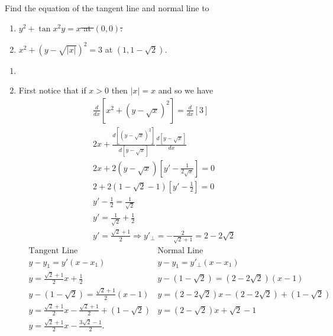 \documentclass[10pt,letterpaper]{hwset}
\begin{document}
\begin{problem}[1.]
	Find the equation of the tangent line and normal line to  
	\begin{enumerate}
		\item \sout{$y^2 + \tan x^2y = x$ at $(0,0)$.}
		\item $x^2+\left(y-\sqrt{|x|}\right)^2=3$ at $(1,1-\sqrt{2})$. 
	\end{enumerate}
\end{problem}

\begin{enumerate}
	\item 
	\item \begin{solution}
			First notice that if $x>0$ then $|x| = x$ and so we have
			\begin{align*}
				&\frac{d}{dx}\left[ x^2 + \left( y-\sqrt{x} \right)^2 \right] =
					\frac{d}{dx}[3] \\
				&2x + \frac{d\left[\left( y-\sqrt{x} \right)^2\right]}{d\left[y-
					\sqrt{x} \right]} \frac{d\left[ y - \sqrt{x}\right]}{dx} \\
				&2x + 2\left( y-\sqrt{x} \right) \left[ y' - \frac{1}{2\sqrt{x}} \right]
					= 0 \\
					&2 + 2\left( 1-\sqrt{2} - 1\right) \left[y'-\frac{1}{2}\right] = 0 \\
					&y'-\frac{1}{2} = \frac{1}{\sqrt{2}} \\
					&y' = \frac{1}{\sqrt{2}} + \frac{1}{2} \\
					&y' = \frac{\sqrt{2} + 1}{2} \Rightarrow y'_{\perp} =
						-\frac{2}{\sqrt{2}+1} = 2-2\sqrt{2}
			\end{align*}
			\begin{align*}
				&\text{Tangent Line} &\text{Normal Line} \\
				&y - y_1 = y'(x - x_1) &y - y_1 = y'_{\perp}(x - x_1) \\ 
				&y = \frac{\sqrt{2} + 1}{2} x + \frac{1}{2}  
					&y - (1 - \sqrt{2}) = (2-2\sqrt{2})(x - 1)  \\
				&y - (1 - \sqrt{2}) = \frac{\sqrt{2} + 1}{2}(x - 1)  
					&y = (2-2\sqrt{2}) x - (2-2\sqrt{2}) + (1 - \sqrt{2})  \\
				&y = \frac{\sqrt{2} + 1}{2} x - \frac{\sqrt{2} + 1}{2} + (1 -
					\sqrt{2}) 
					&\boxed{y = (2 - \sqrt{2}) x + \sqrt{2} - 1} \\
				&\boxed{y = \frac{\sqrt{2} + 1}{2} x - \frac{3\sqrt{2} - 1}{2}}. 
			\end{align*}
		\end{solution}
\end{enumerate}
\end{document}
